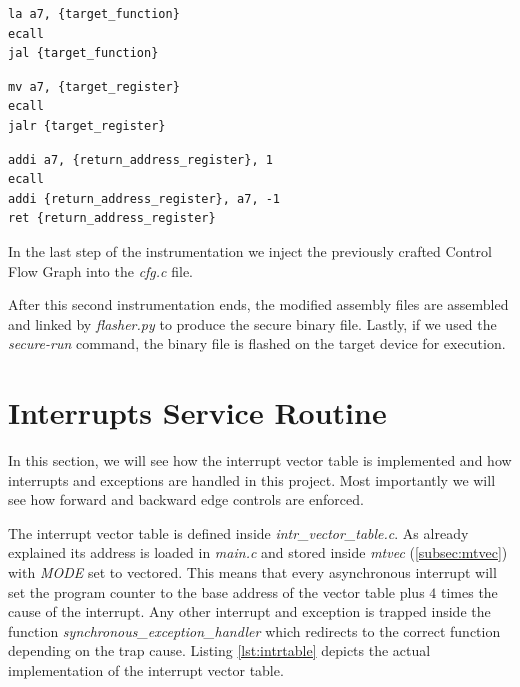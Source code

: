 \begin{lstlisting}[style=Assembly, caption = Direct jump code block, label={lst:dirjumpblock}]
la a7, {target_function}
ecall
jal {target_function}
\end{lstlisting}

\begin{lstlisting}[style=Assembly, caption = Indirect jump code block, label={lst:indirjumpblock}]
mv a7, {target_register}
ecall
jalr {target_register}
\end{lstlisting}

\begin{lstlisting}[style=Assembly, caption = Return code block, label={lst:retblock}]
addi a7, {return_address_register}, 1
ecall
addi {return_address_register}, a7, -1
ret {return_address_register}
\end{lstlisting}

In the last step of the instrumentation we inject the previously crafted Control
Flow Graph into the \textit{cfg.c} file.

After this second instrumentation ends, the modified assembly files are assembled
and linked by \textit{flasher.py} to produce the secure binary file. Lastly, if
we used the \textit{secure-run} command, the binary file is flashed on the
target device for execution.

\section{Interrupts Service Routine}
\label{sec:project_isr}

In this section, we will see how the interrupt vector table is implemented and
how interrupts and exceptions are handled in this project. Most importantly we will
see how forward and backward edge controls are enforced.

The interrupt vector table is defined inside \textit{intr\_vector\_table.c}. As already
explained its address is loaded in \textit{main.c} and stored inside \textit{mtvec}
(\ref{subsec:mtvec}) with \textit{MODE} set to vectored. This means that every asynchronous
interrupt will set the program counter to the base address of the vector table plus
$4$ times the cause of the interrupt. Any other interrupt and exception is
trapped inside the function \textit{synchronous\_exception\_handler} which redirects
to the correct function depending on the trap cause. Listing \ref{lst:intrtable}
depicts the actual implementation of the interrupt vector table.

